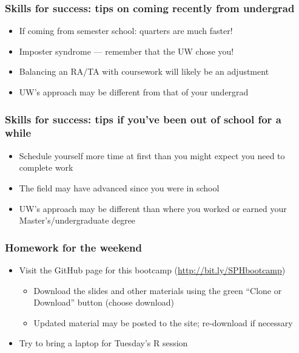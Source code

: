 \documentclass[12pt]{beamer}
\newcommand{\myframe}[1]{\begin{frame} \frametitle{#1}}
\newenvironment{spaceitemize}
{ \begin{itemize}
    \setlength{\itemsep}{10pt}
    \setlength{\parskip}{0pt}
    \setlength{\parsep}{0pt}     }
{ \end{itemize}                  }
\begin{document}
\myframe{Skills for success: tips on coming recently from undergrad}
\begin{spaceitemize}
\item If coming from semester school: quarters are much faster!
\item Imposter syndrome --- remember that the UW chose you!
\item Balancing an RA/TA with coursework will likely be an adjustment
\item UW's approach may be different from that of your undergrad
\end{spaceitemize}
\end{frame}

\myframe{Skills for success: tips if you've been out of school for a while}
\begin{spaceitemize}
\item Schedule yourself more time at first than you might expect you need to complete work
\item The field may have advanced since you were in school
\item UW's approach may be different than where you worked or earned your Master's/undergraduate degree
\end{spaceitemize}
\end{frame}

\myframe{Homework for the weekend}
\begin{spaceitemize}
\item Visit the GitHub page for this bootcamp (\url{http://bit.ly/SPHbootcamp})
\begin{spaceitemize}
\item Download the slides and other materials using the green ``Clone or Download'' button (choose download)
\item Updated material may be posted to the site; re-download if necessary
\end{spaceitemize}
\item Try to bring a laptop for Tuesday's R session
\end{spaceitemize}
\end{frame}
\end{document}
